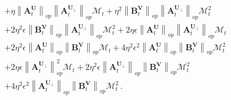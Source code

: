 \begin{lemma}
\begin{align}
        & + \eta \left\|\bm A^{\bm U}_{t}\right\|_{op}\left\|\bm A^{\bm U_\perp}_{t}\right\|_{op}\mathcal{M}_t+\eta^2 \left\|\bm B^{\bm V}_{t}\right\|_{op}\left\|\bm A^{\bm U_\perp}_{t}\right\|_{op}\mathcal{M}_t^2\nonumber\\
        & +2\eta^2 \epsilon \left\|\bm B^{\bm V}_{t}\right\|_{op}\left\|\bm A^{\bm U_\perp}_{t}\right\|_{op}\mathcal{M}_t^2+2\eta \epsilon \left\|\bm A^{\bm U}_{t}\right\|_{op}\left\|\bm A^{\bm U_\perp}_{t}\right\|_{op} \mathcal{M}_t\nonumber\\
        & + 2 \eta^2 \epsilon \left\|\bm A^{\bm U}_{t}\right\|_{op}\left\|\bm B^{\bm V}_{t}\right\|_{op} \mathcal{M}_t + 4 \eta^2 \epsilon^2 \left\|\bm A^{\bm U}_{t}\right\|_{op}\left\|\bm B^{\bm V}_{t}\right\|_{op} \mathcal{M}_t^2\nonumber\\
        & + 2 \eta \epsilon \left\|\bm A^{\bm U_\perp}_{t}\right\|_{op}^2\mathcal{M}_t+2\eta^2 \epsilon \left\|\bm A^{\bm U_\perp}_{t}\right\|_{op}\left\|\bm B^{\bm V}_{t}\right\|_{op}\mathcal{M}_t^2\nonumber\\
        & + 4 \eta^2 \epsilon^2 \left\|\bm A^{\bm U_\perp}_{t}\right\|_{op}\left\|\bm B^{\bm V}_{t}\right\|_{op} \mathcal{M}_t^2\,.\nonumber
    \end{align}
\end{lemma}
